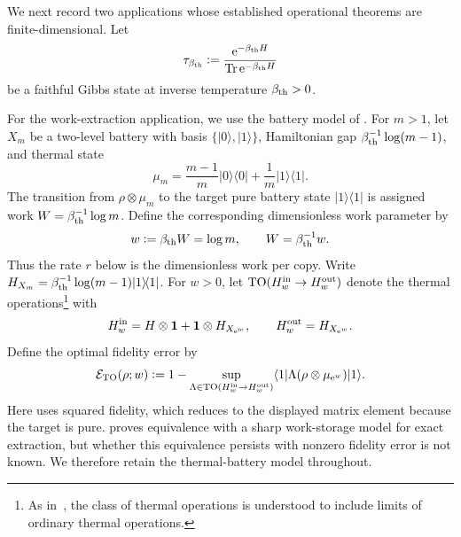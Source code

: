 \documentclass[12pt]{article}
\numberwithin{equation}{section}
\theoremstyle{definition}
\theoremstyle{remark}
\newcommand{\one}{\mathbf 1}
\newcommand{\?}{\overset{?}{=}}
\newcommand{\defeq}{\mathrel{\mathop:}=}
\DeclareMathOperator{\Tr}{Tr}
\newcommand{\e}{\epsilon}
\renewcommand{\e}{\mathrm e}
\begin{document}
We next record two applications whose established operational theorems are
finite-dimensional.  Let
\begin{equation}
  \tau_{\beta_{\rm th}}
  \defeq \frac{\e^{-\beta_{\rm th}H}}
          {\Tr\e^{-\beta_{\rm th}H}}
  \label{eq:gibbs-state}
\end{equation}
be a faithful Gibbs state at inverse temperature $\beta_{\rm th}>0$.

For the work-extraction application, we use the battery model of
\cite{Watanabe:2026pzw}.  For $m>1$, let $X_m$ be a two-level battery with
basis $\{|0\rangle,|1\rangle\}$, Hamiltonian gap
$\beta_{\rm th}^{-1}\log(m-1)$, and thermal state
\[
  \mu_m
  =\frac{m-1}{m}|0\rangle\!\langle0|
   +\frac1m|1\rangle\!\langle1|.
\]
The transition from $\rho\otimes\mu_m$ to the target pure battery state
$|1\rangle\!\langle1|$ is assigned work
$W=\beta_{\rm th}^{-1}\log m$. Define the corresponding
dimensionless work parameter by
\[
  w\defeq\beta_{\rm th}W=\log m,
  \qquad
  W=\beta_{\rm th}^{-1}w.
\]
Thus the rate $r$ below is the dimensionless work per copy.
Write
$H_{X_m}=\beta_{\rm th}^{-1}\log(m-1)|1\rangle\!\langle1|$.  For $w>0$,
let ${\rm TO}(H_w^{\rm in}\to H_w^{\rm out})$ denote the thermal operations\footnote{As in~\cite{Watanabe:2026pzw}, the class of thermal operations is
understood to include limits of ordinary thermal operations.}
with
\[
  H_w^{\rm in}=H\otimes\one+\one\otimes H_{X_{\e^w}},
  \qquad H_w^{\rm out}=H_{X_{\e^w}}.
\]
Define the optimal fidelity error by
\[
  \mathcal E_{\rm TO}(\rho;w)
  \defeq 1-\sup_{\Lambda\in{\rm TO}(H_w^{\rm in}\to H_w^{\rm out})}
  \langle1|\Lambda(\rho\otimes\mu_{\e^w})|1\rangle.
\]
Here \cite{Watanabe:2026pzw} uses squared fidelity, which reduces to the displayed
matrix element because the target is pure.  \cite[Lemma~S.15]{Watanabe:2026pzw} proves equivalence with a sharp work-storage model
for exact extraction, but whether this equivalence persists with nonzero
fidelity error is not known.  We therefore retain the thermal-battery
model throughout.
\end{document}

